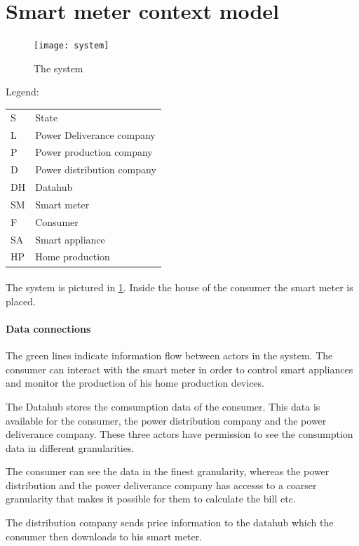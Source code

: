\section{Smart meter context model}

\begin{figure}
  \texttt{[image: system]}
  \caption{The system}
  \label{contextual:system}
\end{figure}
Legend:

\begin{tabular}{l | l}
  S  & State \\
  L & Power Deliverance company\\
  P & Power production company\\
  D & Power distribution company\\
  DH & Datahub \\
  SM & Smart meter\\
  F & Consumer\\
  SA & Smart appliance\\
  HP & Home production\\
\end{tabular}


\paragraph{} The system is pictured in \cref{contextual:system}.
Inside the house of the consumer the smart meter is placed.

\paragraph{Data connections}
The green lines indicate information flow between actors in the system.
The consumer can interact with the smart meter in order to control smart appliances and monitor the production of his home production devices.

The Datahub stores the comsumption data of the consumer.
This data is available for the consumer, the power distribution company and the power deliverance company.
These three actors have permission to see the consumption data in different granularities.

The consumer can see the data in the finest granularity, whereas the power distribution and the power deliverance company has accesss to a coarser granularity that makes it possible for them to calculate the bill etc.

The distribution company sends price information to the datahub which the consumer then downloads to his smart meter.

